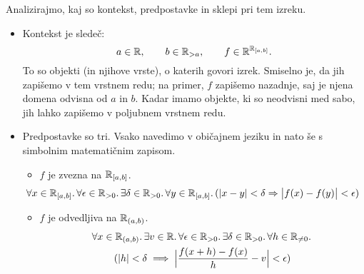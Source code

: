         Analizirajmo, kaj so kontekst, predpostavke in sklepi pri tem izreku.

        \begin{itemize}
                \item
                        Kontekst je sledeč:
                        \[a \in \mathbb{R}, \qquad b \in \mathbb{R}_{> a}, \qquad f \in \mathbb{R}^{{\mathbb{R}}_{[a, b]}}.\]
                        To so objekti (in njihove vrste), o katerih govori izrek. Smiselno je, da jih zapišemo v tem vrstnem redu; na primer, $f$ zapišemo nazadnje, saj je njena domena odvisna od $a$ in $b$. Kadar imamo objekte, ki so neodvisni med sabo, jih lahko zapišemo v poljubnem vrstnem redu.
                \item
                        Predpostavke so tri. Vsako navedimo v običajnem jeziku in nato še s simbolnim matematičnim zapisom.
                        \begin{itemize}
                                \item
                                        $f$ je zvezna na ${\mathbb{R}}_{[a, b]}$.
                                        \[
                                                \hspace{-2em}
                                                \all{x \in \intcc{a}{b}}
                                                        \all{\epsilon \in \RR_{> 0}}
                                                                \some{\delta \in \RR_{> 0}}
                                                                        \all{y \in \intcc{a}{b}}
                                                                                (|x - y| < \delta \impl \big|f(x) - f(y)\big| < \epsilon
                                                                        )
                                        \]
                                \item
                                        $f$ je odvedljiva na ${\mathbb{R}}_{(a, b)}$.
                                        \begin{multline*}
                                                \all{x \in \intoo{a}{b}}
                                                        \some{v \in \RR}
                                                                \all{\epsilon \in \RR_{> 0}}
                                                                        \some{\delta \in \RR_{> 0}}
                                                \all{h \in \RR_{\neq 0}} \\
                                                        (|h| < \delta \implies \Big|\frac{f(x + h) - f(x)}{h} - v\Big| < \epsilon)

\end{multline*}
\end{itemize}
\end{itemize}
